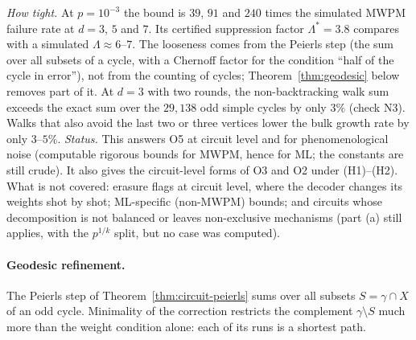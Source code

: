 \noindent\emph{How tight.} At $p=10^{-3}$ the bound is $39$, $91$ and $240$ times the simulated MWPM failure rate at $d=3$, $5$ and $7$. Its certified suppression factor $\Lambda^\ast=3.8$ compares with a simulated $\Lambda\approx6$--$7$.
The looseness comes from the Peierls step (the sum over all subsets of a cycle, with a Chernoff factor for the condition ``half of the cycle in error''), not from the counting of cycles; Theorem~\ref{thm:geodesic} below removes part of it. At $d=3$ with two rounds, the non-backtracking walk sum exceeds the exact sum over the $29{,}138$ odd simple cycles by only $3\%$ (check N3). Walks that also avoid the last two or three vertices lower the bulk growth rate by only $3$--$5\%$.
\emph{Status.} This answers O5 at circuit level and for phenomenological noise (computable rigorous bounds for MWPM, hence for ML; the constants are still crude). It also gives the circuit-level forms of O3 and O2 under (H1)--(H2). What is not covered: erasure flags at circuit level, where the decoder changes its weights shot by shot; ML-specific (non-MWPM) bounds; and circuits whose decomposition is not balanced or leaves non-exclusive mechanisms (part (a) still applies, with the $p^{1/k}$ split, but no case was computed).

\paragraph*{Geodesic refinement.} The Peierls step of Theorem~\ref{thm:circuit-peierls} sums over all subsets $S=\gamma\cap X$ of an odd cycle. Minimality of the correction restricts the complement $\gamma\setminus S$ much more than the weight condition alone: each of its runs is a shortest path.

